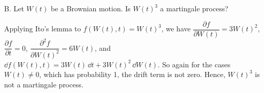\begin{problem}{B. Let $W(t)$ be a Brownian motion. Is $W(t)^3$ a martingale process?}
\end{problem}


\begin{solution}
Applying Ito's lemma to $f(W(t),t)=W(t)^3$, we have
$\dfrac{\partial f}{\partial W(t)}=3W(t)^2$,
$\dfrac{\partial f}{\partial t}=0$, $\dfrac{\partial^2 f}{\partial W(t)^2}=6W(t)$, and
$\dd f(W(t),t)=3W(t)\,\dd t+3W(t)^2\,\dd W(t)$. So again for the cases $W(t)\ne0$, which has
probability 1, the drift term is not zero. Hence, $W(t)^3$ is not a martingale process.
\end{solution}
